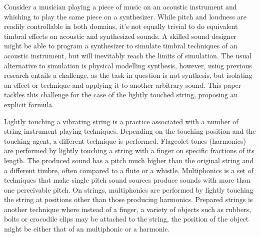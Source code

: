 \documentclass{sigchi}
\begin{document}

Consider a musician playing a piece of music on an acoustic instrument and whishing to play the same piece on a synthesizer.
While pitch and loudness are readily controllable in both domains, it's not equally trivial to do equivalent timbral effects on acoustic and synthesized sounds.
A skilled sound designer might be able to program a synthesizer to simulate timbral techniques of an acoustic instrument, but will inevitably reach the limits of simulation.
The usual alternative to simulation is physical modelling synthesis, however, using previous research entails a challenge, as the task in question is not synthesis, but isolating an effect or technique and applying it to another arbitrary sound.
This paper tackles this challenge for the case of the lightly touched string, proposing an explicit formula.

Lightly touching a vibrating string is a practice associated with a number of string instrument playing techniques.
Depending on the touching position and the touching agent, a different technique is performed.
Flageolet tones (harmonics) are performed by lightly touching a string with a finger on specific fractions of its length.
The produced sound has a pitch much higher than the original string and a different timbre, often compared to a flute or a whistle.
Multiphonics is a set of techniques that make single pitch sound sources produce sounds with more than one perceivable pitch.
On strings, multiphonics are performed by lightly touching the string at positions other than those producing harmonics.
Prepared strings is another technique where instead of a finger, a variety of objects such as rubbers, bolts or crocodile clips may be attached to the string, the position of the object might be either that of an multiphonic or a harmonic.
\end{document}
